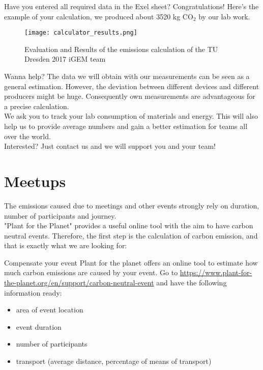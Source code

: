 Have you entered all required data in the Exel sheet? Congratulations! Here’s the example of your calculation, we produced about 3520 kg CO$_2$ by our lab work.

\begin{figure}[h!]
	\centering
	\texttt{[image: calculator\_results.png]}%
	\caption{Evaluation and Results of the emissions calculation of the TU Dresden 2017 iGEM team}%
\end{figure}

\begin{suggest}{Wanna help?}
	The data we will obtain with our measurements can be seen as a general estimation.
	However, the deviation between different devices and different producers might be huge. Consequently own measurements are advantageous for a precise calculation.\\
	We ask you to track your lab consumption of materials and energy. This will also help us to provide average numbers and gain a better estimation for teams all over the world. \\
	Interested? Just contact us and we will support you and your team!
	
\end{suggest}

\section{Meetups}

The emissions caused due to meetings and other events strongly rely on duration, number of participants and journey. \\
"Plant for the Planet" provides a useful online tool with the aim to have carbon neutral events. Therefore, the first step is the calculation of carbon emission, and that is exactly what we are looking for:

\begin{suggest} {Compensate your event} %
	Plant for the planet offers an online tool to estimate how much carbon emissions are caused by your event. Go to \url{https://www.plant-for-the-planet.org/en/support/carbon-neutral-event} and have the following information ready:
	\begin{itemize}
		\item area of event location
		\item event duration
		\item number of participants
		\item transport (average distance, percentage of means of transport)
	\end{itemize}
\end{suggest}


